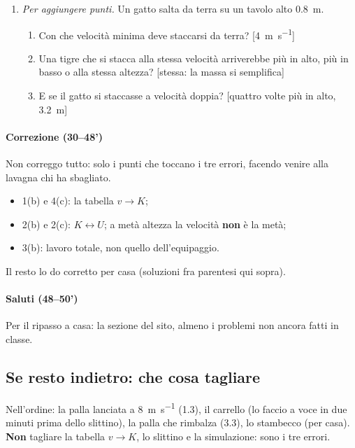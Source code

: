 \documentclass[11pt]{report}
\begin{document}
\begin{enumerate}
\begin{enumerate}
  \end{enumerate}
  \item[4.] \emph{Per aggiungere punti.} Un gatto salta da terra su un tavolo alto \SI{0.8}{\metre}.
  \begin{enumerate}
    \item Con che velocità minima deve staccarsi da terra? [\SI{4}{\metre\per\second}]
    \item Una tigre che si stacca alla stessa velocità arriverebbe più in alto, più in basso o alla stessa altezza? [stessa: la massa si semplifica]
    \item E se il gatto si staccasse a velocità doppia? [quattro volte più in alto, \SI{3.2}{\metre}]
  \end{enumerate}
\end{enumerate}

\paragraph{Correzione (30--48')}
Non correggo tutto: solo i punti che toccano i tre errori, facendo venire alla lavagna chi ha sbagliato.
\begin{itemize}
  \item 1(b) e 4(c): la tabella $v\to K$;
  \item 2(b) e 2(c): $K\leftrightarrow U$; a metà altezza la velocità \textbf{non} è la metà;
  \item 3(b): lavoro totale, non quello dell'equipaggio.
\end{itemize}
Il resto lo do corretto per casa (soluzioni fra parentesi qui sopra).

\paragraph{Saluti (48--50')}
Per il ripasso a casa: la sezione  del sito, almeno i problemi non ancora fatti in classe.

\subsection*{Se resto indietro: che cosa tagliare}
Nell'ordine: la palla lanciata a \SI{8}{\metre\per\second} (1.3), il carrello (lo faccio a voce in due minuti prima dello slittino), la palla che rimbalza (3.3), lo stambecco (per casa). \textbf{Non} tagliare la tabella $v\to K$, lo slittino e la simulazione: sono i tre errori.
\end{document}
